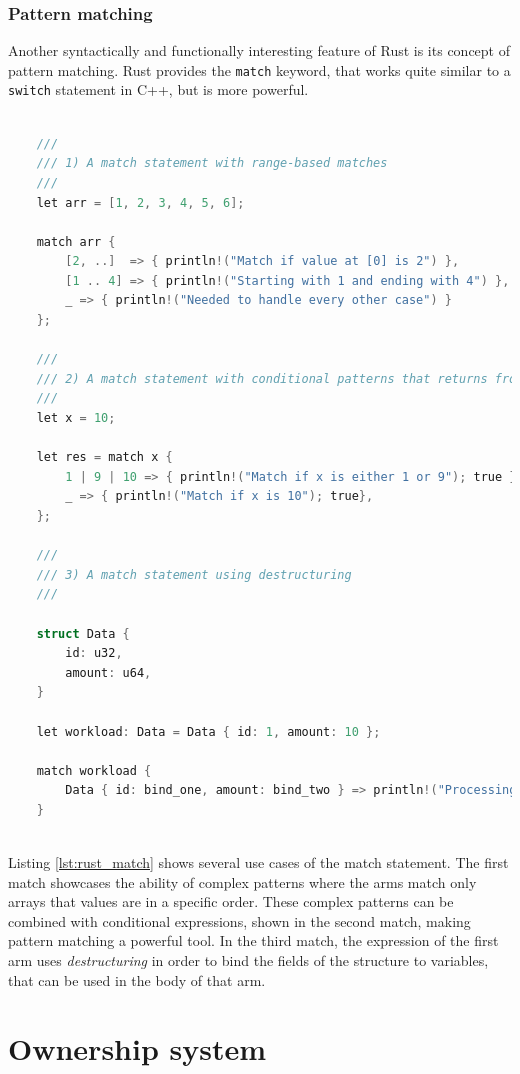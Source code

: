 \subsubsection{Pattern matching}

Another syntactically and functionally interesting feature of Rust is its concept of pattern matching. Rust provides the \texttt{match} keyword, that works quite similar to a \texttt{switch} statement in C++, but is more powerful. 

\begin{lstlisting}[caption={Match statement in Rust, allowing for complex pattern matching in each arm}, label={lst:rust_match}, language=C]

	///
	/// 1) A match statement with range-based matches
	///
	let arr = [1, 2, 3, 4, 5, 6];
	
	match arr {
		[2, ..]  => { println!("Match if value at [0] is 2") },
		[1 .. 4] => { println!("Starting with 1 and ending with 4") },
		_ => { println!("Needed to handle every other case") }
	};
	
	///
	/// 2) A match statement with conditional patterns that returns from every arm
	///
	let x = 10;
	
	let res = match x {
		1 | 9 | 10 => { println!("Match if x is either 1 or 9"); true },
		_ => { println!("Match if x is 10"); true},
	};
	
	///
	/// 3) A match statement using destructuring
	///
	
	struct Data { 
		id: u32,
		amount: u64, 
	}
	
	let workload: Data = Data { id: 1, amount: 10 };
	
	match workload {
		Data { id: bind_one, amount: bind_two } => println!("Processing id: {} with amount: {}", bind_one, bind_two),
	}
	
\end{lstlisting}

\noindent
Listing \ref{lst:rust_match} shows several use cases of the match statement. The first match showcases the ability of complex patterns where the arms match only arrays that values are in a specific order. These complex patterns can be combined with conditional expressions, shown in the second match, making pattern matching a powerful tool. In the third match, the expression of the first arm uses \textit{destructuring} in order to bind the fields of the structure to variables, that can be used in the body of that arm.

\section{Ownership system}

